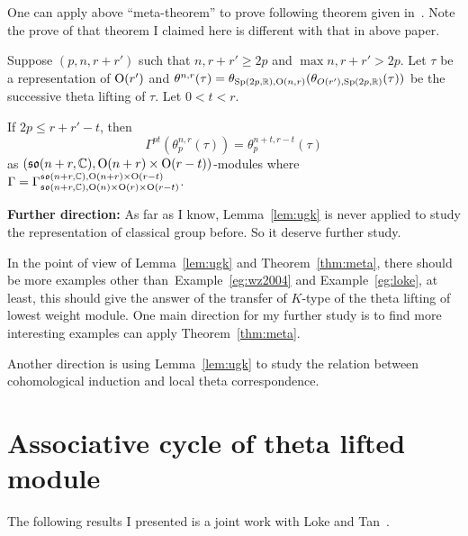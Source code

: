 \documentclass{amsart}
\begin{document}
One can apply above ``meta-theorem'' to prove following theorem given in~\cite{LokeMaTang2011}. 
Note the prove of that theorem I claimed here is different with that in above paper.
\begin{eg} \label{eg:loke} Suppose
  $(p,n, r + r')$ such that $n,r+r'\geq2p$ and $\max{n,r+r'}> 2p$.
  Let $\tau$ be a representation of ${\rm O}(r')$ and $\theta^{n,r}(\tau) =
  \theta_{{\rm Sp}(2p,{\mathbb{R}}),{\rm O}(n,r)}(\theta_{O(r'),{\rm Sp}(2p,{\mathbb{R}})}(\tau))$ be
  the successive theta lifting of $\tau$. Let $0 < t< r$.

  If $2p \leq r+r'-t$, then
\[
\Gamma^{pt}(\theta_p^{n,r}(\tau)) =
  \theta_p^{n+t,r-t}(\tau)
\]
as $(\mathfrak{so}(n+r,{\mathbb{C}}), {\rm O}(n+r)\times{\rm O}(r-t))$-modules where $\Gamma = \Gamma_{\mathfrak{so}(n+r,{\mathbb{C}}),{\rm O}(n)\times {\rm O}(r)\times {\rm O}(r-t)}^{\mathfrak{so}(n+r,{\mathbb{C}}),{\rm O}(n+r)\times {\rm O}(r-t)}$.
\end{eg}

{\bf Further direction:}
As far as I know, Lemma~\ref{lem:ugk} is never applied to study the representation of classical group before. So it deserve further study.  

In the point of view of Lemma~\ref{lem:ugk} and
Theorem~\ref{thm:meta}, there should be more examples other
than~Example~\ref{eg:wz2004} and Example~\ref{eg:loke}, at least, this
should give the answer of the transfer of $K$-type of the theta
lifting of lowest weight module. One main direction for my further
study is to find more interesting examples can apply
Theorem~\ref{thm:meta}.

Another direction is using Lemma~\ref{lem:ugk} to study the relation between 
cohomological induction and local theta correspondence. 


\section{Associative cycle of theta lifted module}
The following results I presented is a joint work with Loke and Tan~\cite{lokematan2011b}.



{}

\end{document}

